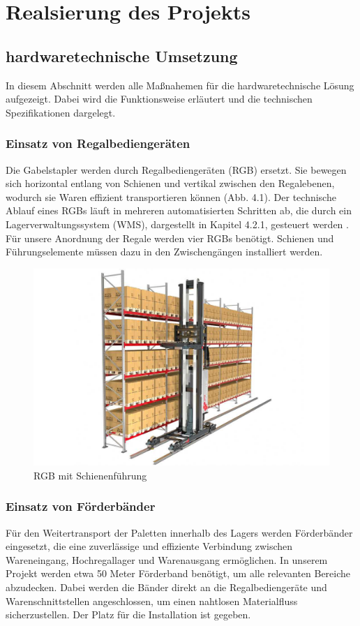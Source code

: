 \chapter{Realsierung des Projekts}

\section{hardwaretechnische Umsetzung}
In diesem Abschnitt werden alle Maßnahemen für die hardwaretechnische Lösung aufgezeigt. Dabei wird die Funktionsweise erläutert und die technischen Spezifikationen dargelegt.
\subsection{Einsatz von Regalbediengeräten}
Die Gabelstapler werden durch Regalbediengeräten (RGB) ersetzt. Sie bewegen sich horizontal entlang von Schienen und vertikal zwischen den Regalebenen, wodurch sie Waren effizient transportieren können (Abb. 4.1).
Der technische Ablauf eines RGBs läuft in mehreren automatisierten Schritten ab, die durch ein Lagerverwaltungssystem (WMS), dargestellt in Kapitel 4.2.1, gesteuert werden \autocites{martin_technische_2021}. Für unsere Anordnung der Regale werden vier RGBs benötigt. Schienen und Führungselemente müssen dazu in den Zwischengängen installiert werden.

\begin{figure}
	\centering
	\includegraphics[width=0.5\linewidth]{images/RGB}
	\caption{RGB mit Schienenführung}
	\label{fig:rgb}
\end{figure}


\subsection{Einsatz von Förderbänder}
Für den Weitertransport der Paletten innerhalb des Lagers werden Förderbänder eingesetzt, die eine zuverlässige und effiziente Verbindung zwischen Wareneingang, Hochregallager und Warenausgang ermöglichen. In unserem Projekt werden etwa 50 Meter Förderband benötigt, um alle relevanten Bereiche abzudecken. Dabei werden die Bänder direkt an die Regalbediengeräte und Warenschnittstellen angeschlossen, um einen nahtlosen Materialfluss sicherzustellen. Der Platz für die Installation ist gegeben.


